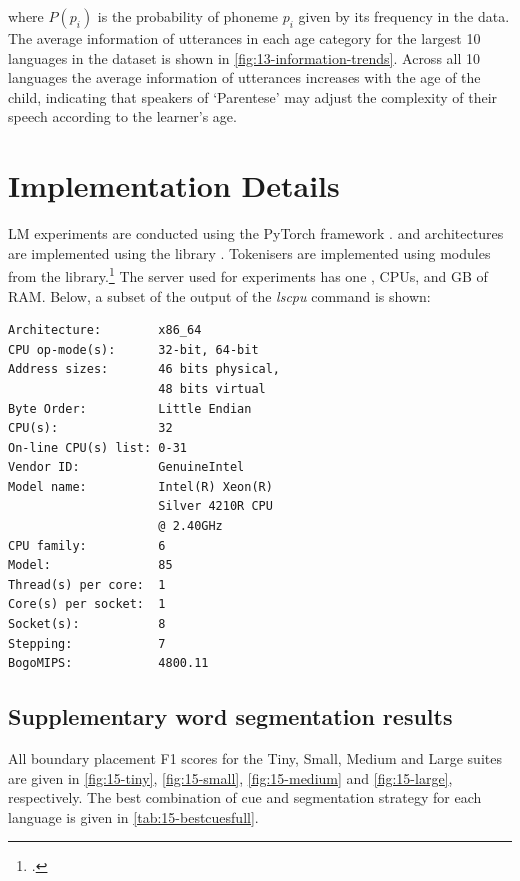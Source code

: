 where $P(p_i)$ is the probability of phoneme $p_i$ given by its frequency in the data. The average information of utterances in each age category for the largest 10 languages in the dataset is shown in \cref{fig:13-information-trends}. Across all 10 languages the average information of utterances increases with the age of the child, indicating that speakers of `Parentese' may adjust the complexity of their speech according to the learner's age. 

\chapter{Implementation Details}\label{app:implementation}


LM experiments are conducted using the PyTorch framework \citep{paszke-etal-2019-pytorch}. \gpt and \llama architectures are implemented using the  library \citep{wolf-etal-2020-transformers}. Tokenisers are implemented using modules from the  library.\footnote{\href{https://github.com/huggingface/tokenizers}{}.} The server used for experiments has one ,  CPUs, and  GB of RAM. Below, a subset of the output of the \emph{lscpu} command is shown:

\begin{tcolorbox}[left=5pt,right=5pt,top=5pt,bottom=5pt]
\small
\begin{verbatim}
Architecture:        x86_64
CPU op-mode(s):      32-bit, 64-bit
Address sizes:       46 bits physical, 
                     48 bits virtual
Byte Order:          Little Endian
CPU(s):              32
On-line CPU(s) list: 0-31
Vendor ID:           GenuineIntel
Model name:          Intel(R) Xeon(R)
                     Silver 4210R CPU
                     @ 2.40GHz
CPU family:          6
Model:               85
Thread(s) per core:  1
Core(s) per socket:  1
Socket(s):           8
Stepping:            7
BogoMIPS:            4800.11
\end{verbatim}
\end{tcolorbox}

\section{Supplementary word segmentation results}\label{app:fullsegresults}

All boundary placement F1 scores for the Tiny, Small, Medium and Large suites are given in \cref{fig:15-tiny}, \cref{fig:15-small}, \cref{fig:15-medium} and \cref{fig:15-large}, respectively. The best combination of cue and segmentation strategy for each language is given in \cref{tab:15-bestcuesfull}.

